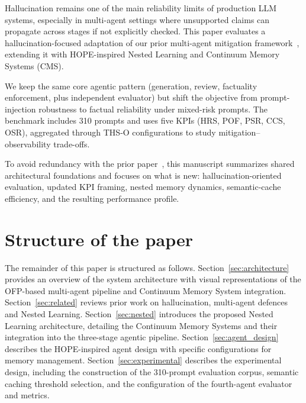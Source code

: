 \documentclass[11pt,a4paper]{article}
\begin{document}
	Hallucination remains one of the main reliability limits of production LLM systems, especially in multi-agent settings where unsupported claims can propagate across stages if not explicitly checked. This paper evaluates a hallucination-focused adaptation of our prior multi-agent mitigation framework~\cite{gosmar2026promptinjectionmitigationagentic}, extending it with HOPE-inspired Nested Learning and Continuum Memory Systems (CMS).
	
	We keep the same core agentic pattern (generation, review, factuality enforcement, plus independent evaluator) but shift the objective from prompt-injection robustness to factual reliability under mixed-risk prompts. The benchmark includes 310 prompts and uses five KPIs (HRS, POF, PSR, CCS, OSR), aggregated through THS-O configurations to study mitigation--observability trade-offs.
	
	To avoid redundancy with the prior paper~\cite{gosmar2026promptinjectionmitigationagentic}, this manuscript summarizes shared architectural foundations and focuses on what is new: hallucination-oriented evaluation, updated KPI framing, nested memory dynamics, semantic-cache efficiency, and the resulting performance profile.
	
	\section{Structure of the paper}
	
	The remainder of this paper is structured as follows. Section~\ref{sec:architecture} provides an overview of the system architecture with visual representations of the OFP-based multi-agent pipeline and Continuum Memory System integration. Section~\ref{sec:related} reviews prior work on hallucination, multi-agent defences and Nested Learning. Section~\ref{sec:nested} introduces the proposed Nested Learning architecture, detailing the Continuum Memory Systems and their integration into the three-stage agentic pipeline. Section~\ref{sec:agent_design} describes the HOPE-inspired agent design with specific configurations for memory management. Section~\ref{sec:experimental} describes the experimental design, including the construction of the 310-prompt evaluation corpus, semantic caching threshold selection, and the configuration of the fourth-agent evaluator and metrics.
	
\end{document}
